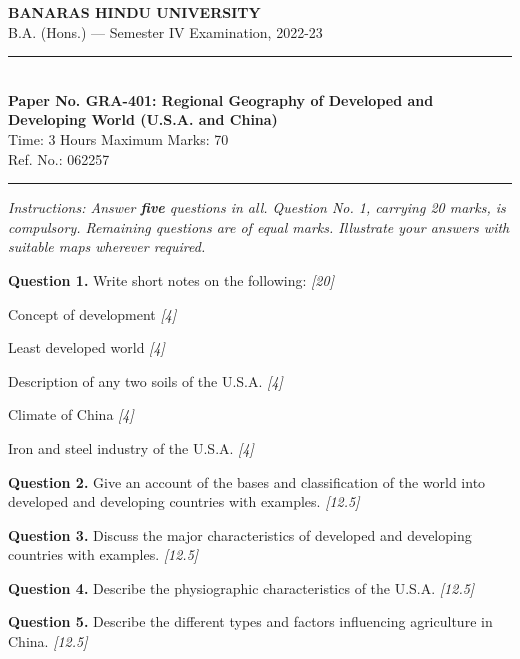 \documentclass[11pt,a4paper]{article}
\newcommand{\pts}[1]{\hfill   \textit{[#1]}}
\begin{document}
\begin{center}
  {\large\bfseries BANARAS HINDU UNIVERSITY}\\[2pt]
  {\normalsize B.A. (Hons.) --- Semester IV Examination, 2022-23}\\[6pt]
  \rule{0.8\linewidth}{0.5pt}\\[6pt]
  {\large\bfseries Paper No. GRA-401: Regional Geography of Developed and Developing World (U.S.A. and China)}\\[4pt]
  {\normalsize Time: 3 Hours \hfill Maximum Marks: 70}\\[2pt]
  {\small Ref. No.: 062257}
\end{center}
\rule{\linewidth}{0.4pt}
\smallskip



\noindent   \textit{Instructions: Answer   \textbf{five} questions in all. Question No. 1, carrying 20 marks, is compulsory. Remaining questions are of equal marks. Illustrate your answers with suitable maps wherever required.}
\bigskip




\noindent   \textbf{Question 1.} Write short notes on the following: \pts{20}

\begin{parts}
  \item Concept of development \pts{4}
  \item Least developed world \pts{4}
  \item Description of any two soils of the U.S.A. \pts{4}
  \item Climate of China \pts{4}
  \item Iron and steel industry of the U.S.A. \pts{4}
\end{parts}

\medskip


\noindent   \textbf{Question 2.} Give an account of the bases and classification of the world into developed and developing countries with examples. \pts{12.5}

\medskip


\noindent   \textbf{Question 3.} Discuss the major characteristics of developed and developing countries with examples. \pts{12.5}

\medskip


\noindent   \textbf{Question 4.} Describe the physiographic characteristics of the U.S.A. \pts{12.5}

\medskip


\noindent   \textbf{Question 5.} Describe the different types and factors influencing agriculture in China. \pts{12.5}
\end{document}
